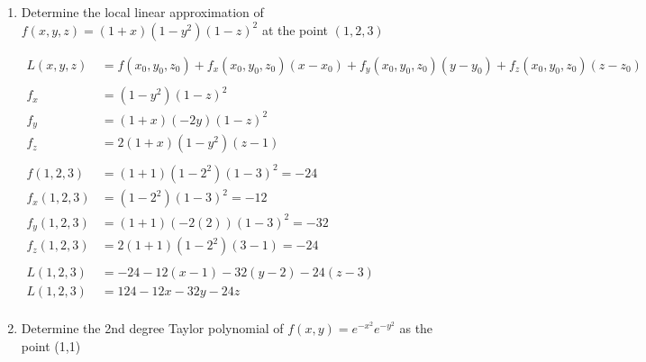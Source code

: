 \documentclass[a4paper,11pt]{article}
\begin{document}
\begin{preview}
\begin{enumerate}
\begin{enumerate}
        \item Determine the local linear approximation of $f(x, y, z) = (1+x)(1-y^2)(1-z)^2$ at the point $(1, 2, 3)$
        
        \begin{align*}
            L(x,y,z) &= f(x_0, y_0, z_0) + f_x(x_0, y_0, z_0)(x-x_0) + f_y(x_0, y_0, z_0)(y-y_0) + f_z(x_0, y_0, z_0)(z-z_0)\\\\
            f_{x}        & = (1-y^2)(1-z)^2                               \\
            f_{y}        & = (1+x)(-2y)(1-z)^2                            \\
            f_{z}        & = 2(1+x)(1-y^2)(z-1)                           \\\\
            f(1,2,3)     & = (1+1)(1-2^2)(1-3)^2=-24                      \\  
            f_{x}(1,2,3) & = (1-2^2)(1-3)^2=-12                           \\
            f_{y}(1,2,3) & = (1+1)(-2(2))(1-3)^2=-32                      \\
            f_{z}(1,2,3) & = 2(1+1)(1-2^2)(3-1)=-24                       \\\\
            L(1,2,3)     & = -24 -12(x - 1) -32(y - 2) -24(z - 3)\\
            L (1,2,3)    & = 124-12x-32y-24z\\
        \end{align*}
    
        \item Determine the 2nd degree Taylor polynomial of $ f(x,y) = e^{-x^2}e^{-y^2} $ as the point (1,1)


\end{enumerate}
\end{enumerate}
\end{preview}
\end{document}
